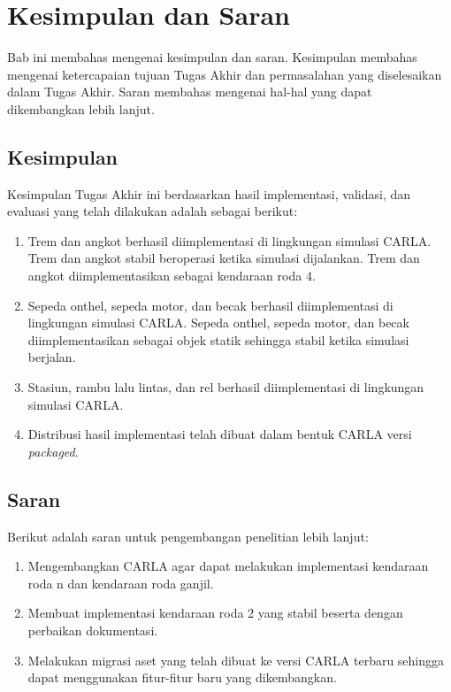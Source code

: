 \chapter{Kesimpulan dan Saran}

Bab ini membahas mengenai kesimpulan dan saran. Kesimpulan membahas mengenai
ketercapaian tujuan Tugas Akhir dan permasalahan yang diselesaikan dalam Tugas
Akhir. Saran membahas mengenai hal-hal yang dapat dikembangkan lebih lanjut.

\section{Kesimpulan}

Kesimpulan Tugas Akhir ini berdasarkan hasil implementasi, validasi, dan
evaluasi yang telah dilakukan adalah sebagai berikut:

\begin{enumerate}
	\item Trem dan angkot berhasil diimplementasi di lingkungan simulasi CARLA.
	Trem dan angkot stabil beroperasi ketika simulasi dijalankan. Trem dan
	angkot diimplementasikan sebagai kendaraan roda 4.

	\item Sepeda onthel, sepeda motor, dan becak berhasil diimplementasi di
	lingkungan simulasi CARLA. Sepeda onthel, sepeda motor, dan becak diimplementasikan
	sebagai objek statik sehingga stabil ketika simulasi berjalan.

	\item Stasiun, rambu lalu lintas, dan rel berhasil diimplementasi di
	lingkungan simulasi CARLA.

	\item Distribusi hasil implementasi telah dibuat dalam bentuk CARLA versi
	\textit{packaged}.

\end{enumerate}

\section{Saran}

Berikut adalah saran untuk pengembangan penelitian lebih lanjut:

\begin{enumerate}
	\item Mengembangkan CARLA agar dapat melakukan implementasi kendaraan roda
	n dan kendaraan roda ganjil.
	\item Membuat implementasi kendaraan roda 2 yang stabil beserta dengan
	perbaikan dokumentasi.
	\item Melakukan migrasi aset yang telah dibuat ke versi CARLA terbaru
	sehingga dapat menggunakan fitur-fitur baru yang dikembangkan.
\end{enumerate}

\blindtext
